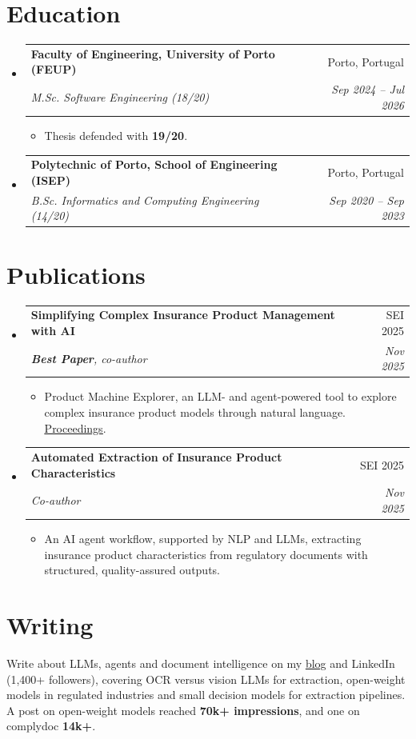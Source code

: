 \documentclass[a4paper,11pt]{article}
\makeatletter
\newcommand{\resumeItem}[1]{
  \item\small{
    {#1 \vspace{-2pt}}
  }
}
\newcommand{\resumeSubheading}[4]{
  \vspace{-2pt}\item
    \begin{tabular*}{0.97\textwidth}[t]{l@{\extracolsep{\fill}}r}
      \textbf{#1} & #2 \\
      \textit{\small#3} & \textit{\small #4} \\
    \end{tabular*}\vspace{-7pt}
}
\newcommand{\resumeSubHeadingListStart}{\begin{itemize}[leftmargin=0.15in, label={}]}
\newcommand{\resumeSubHeadingListEnd}{\end{itemize}}
\newcommand{\resumeItemListStart}{\begin{itemize}[itemsep=0pt,topsep=2pt]}
\newcommand{\resumeItemListEnd}{\end{itemize}\vspace{-5pt}}
\makeatother
\begin{document}
\section{Education}
  \resumeSubHeadingListStart
    \resumeSubheading
      {Faculty of Engineering, University of Porto (FEUP)}{Porto, Portugal}
      {M.Sc. Software Engineering (18/20)}{Sep 2024 -- Jul 2026}
      \resumeItemListStart
        \resumeItem{Thesis defended with \textbf{19/20}.}
      \resumeItemListEnd
    \resumeSubheading
      {Polytechnic of Porto, School of Engineering (ISEP)}{Porto, Portugal}
      {B.Sc. Informatics and Computing Engineering (14/20)}{Sep 2020 -- Sep 2023}
  \resumeSubHeadingListEnd

\section{Publications}
  \resumeSubHeadingListStart
    \resumeSubheading
        {Simplifying Complex Insurance Product Management with AI}{SEI 2025}
        {\textbf{Best Paper}, co-author}{Nov 2025}
        \resumeItemListStart
          \resumeItem{Product Machine Explorer, an LLM- and agent-powered tool to explore complex insurance product models through natural language. \href{https://sei.dei.isep.ipp.pt/wp-content/uploads/2026/01/SEI25-LdA.pdf}{\underline{Proceedings}}.}
        \resumeItemListEnd
    \resumeSubheading
        {Automated Extraction of Insurance Product Characteristics}{SEI 2025}
        {Co-author}{Nov 2025}
        \resumeItemListStart
          \resumeItem{An AI agent workflow, supported by NLP and LLMs, extracting insurance product characteristics from regulatory documents with structured, quality-assured outputs.}
        \resumeItemListEnd
  \resumeSubHeadingListEnd

\section{Writing}
 \begin{itemize}[leftmargin=0.15in, label={}]
    \small{\item{
     Write about LLMs, agents and document intelligence on my \href{https://duartecaldascardoso.github.io/portfolio/}{\underline{blog}} and LinkedIn (1,400+ followers), covering OCR versus vision LLMs for extraction, open-weight models in regulated industries and small decision models for extraction pipelines. A post on open-weight models reached \textbf{70k+ impressions}, and one on complydoc \textbf{14k+}.
    }}
 \end{itemize}
\end{document}
